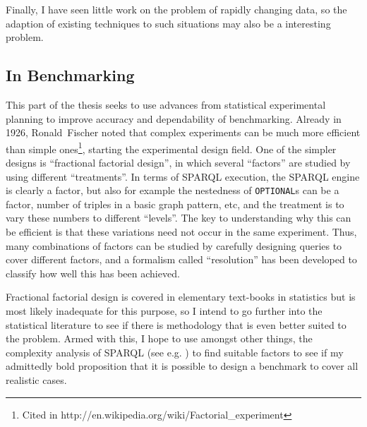 \documentclass{llncs}
\begin{document}
Finally, I have seen little work on the problem of rapidly changing
data, so the adaption of existing techniques to such situations may
also be a interesting problem.


\subsection{In Benchmarking}\label{sec:benchmethod}

This part of the thesis seeks to use advances from statistical
experimental planning to improve accuracy and dependability of
benchmarking. Already in 1926, Ronald~Fischer noted that complex
experiments can be much more efficient than simple ones\footnote{Cited
  in http://en.wikipedia.org/wiki/Factorial\_experiment}, starting the
experimental design field. One of the simpler designs is ``fractional
factorial design'', in which several ``factors'' are studied by using
different ``treatments''. In terms of SPARQL execution, the SPARQL
engine is clearly a factor, but also for example the nestedness of
\texttt{OPTIONAL}s can be a factor, number of triples in a basic graph
pattern, etc, and the treatment is to vary these numbers to different
``levels''. The key to understanding why this can be efficient is that
these variations need not occur in the same experiment. Thus, many
combinations of factors can be studied by carefully designing queries
to cover different factors, and a formalism called ``resolution'' has
been developed to classify how well this has been achieved.

Fractional factorial design is covered in elementary text-books in
statistics but is most likely inadequate for this purpose, so I
intend to go further into the statistical literature to see if there
is methodology that is even better suited to the problem. Armed with
this, I hope to use amongst other things, the complexity analysis of
SPARQL (see e.g. \cite{Schmidt:2010:FSQ:1804669.1804675}) to find
suitable factors to see if my admittedly bold proposition that it is
possible to design a benchmark to cover all realistic cases.


%
%


\end{document}
